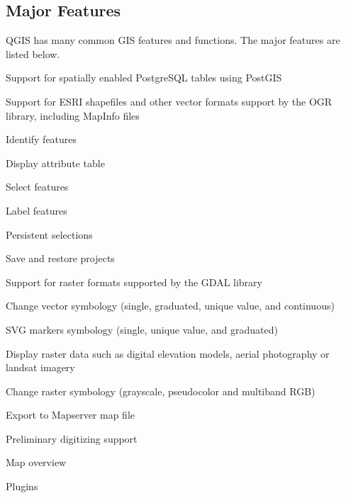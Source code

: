 \subsection{Major Features}

QGIS has many common GIS features and functions. The major features
are listed below. 

\begin{compactenum}
\item Support for spatially enabled PostgreSQL tables using PostGIS 
\item Support for ESRI shapefiles and other vector formats support by the
OGR library, including MapInfo files 
\item Identify features 
\item Display attribute table 
\item Select features 
\item Label features
\item Persistent selections 
\item Save and restore projects
\item Support for raster formats supported by the GDAL library 
\item Change vector symbology (single, graduated, unique value, and continuous) 
\item SVG markers symbology (single, unique value, and graduated) 
\item Display raster data such as digital elevation models, aerial photography
or landsat imagery 
\item Change raster symbology (grayscale, pseudocolor and multiband RGB) 
\item Export to Mapserver map file 
\item Preliminary digitizing support
\item Map overview
\item Plugins 
\end{compactenum}